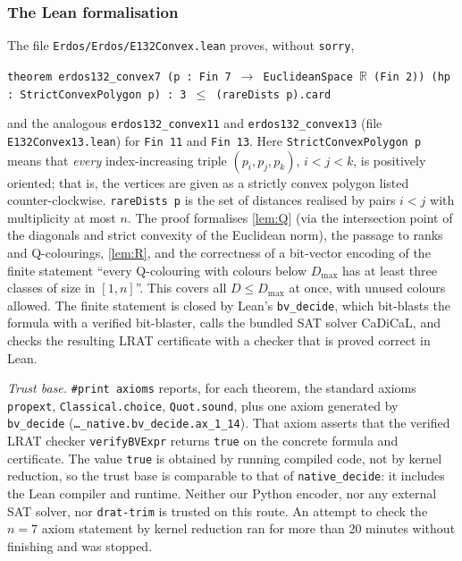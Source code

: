 \documentclass[11pt]{amsart}
\theoremstyle{definition}
\theoremstyle{remark}
\newcommand{\R}{\mathbb{R}}
\begin{document}
\subsubsection*{The Lean formalisation}
The file \texttt{Erdos/Erdos/E132Convex.lean} proves, without \texttt{sorry},
\begin{center}
\texttt{theorem erdos132\_convex7 (p : Fin 7 $\to$ EuclideanSpace $\R$ (Fin 2)) (hp : StrictConvexPolygon p) : 3 $\le$ (rareDists p).card}
\end{center}
and the analogous \texttt{erdos132\_convex11} and \texttt{erdos132\_convex13} (file \texttt{E132Convex13.lean}) for \texttt{Fin 11} and \texttt{Fin 13}. Here \texttt{StrictConvexPolygon p} means that \emph{every} index-increasing triple $(p_i,p_j,p_k)$, $i<j<k$, is positively oriented; that is, the vertices are given as a strictly convex polygon listed counter-clockwise. \texttt{rareDists p} is the set of distances realised by pairs $i<j$ with multiplicity at most $n$. The proof formalises \cref{lem:Q} (via the intersection point of the diagonals and strict convexity of the Euclidean norm), the passage to ranks and Q-colourings, \cref{lem:R}, and the correctness of a bit-vector encoding of the finite statement ``every Q-colouring with colours below $D_{\max}$ has at least three classes of size in $[1,n]$''. This covers all $D\le D_{\max}$ at once, with unused colours allowed. The finite statement is closed by Lean's \texttt{bv\_decide}, which bit-blasts the formula with a verified bit-blaster, calls the bundled SAT solver CaDiCaL, and checks the resulting LRAT certificate with a checker that is proved correct in Lean.

\emph{Trust base.} \texttt{\#print\allowbreak{} axioms} reports, for each theorem, the standard axioms \texttt{propext}, \texttt{Classical.choice}, \texttt{Quot.sound}, plus one axiom generated by \texttt{bv\_decide} (\texttt{\dots\_native.\allowbreak bv\_decide.\allowbreak ax\_1\_14}). That axiom asserts that the verified LRAT checker \texttt{verifyBVExpr} returns \texttt{true} on the concrete formula and certificate. The value \texttt{true} is obtained by running compiled code, not by kernel reduction, so the trust base is comparable to that of \texttt{native\_decide}: it includes the Lean compiler and runtime. Neither our Python encoder, nor any external SAT solver, nor \texttt{drat-trim} is trusted on this route. An attempt to check the $n=7$ axiom statement by kernel reduction ran for more than 20 minutes without finishing and was stopped.
\end{document}
